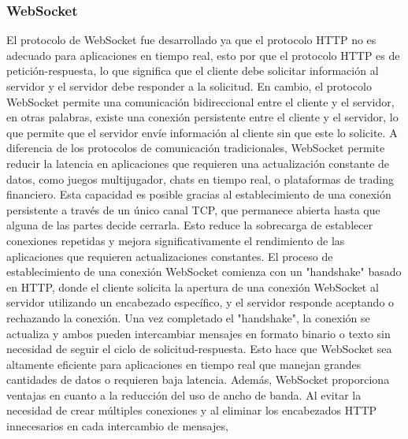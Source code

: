 \subsubsection{WebSocket}
\label{sub:WebSocket}
    El protocolo de WebSocket fue desarrollado ya que el protocolo HTTP no es adecuado para aplicaciones en tiempo real, esto por que 
        el protocolo HTTP es de petici\'on-respuesta, lo que significa que el cliente debe solicitar informaci\'on al servidor y el servidor
        debe responder a la solicitud. En cambio, el protocolo WebSocket permite una comunicaci\'on bidireccional entre el cliente y el servidor,
        en otras palabras, existe una conexi\'on persistente entre el cliente y el servidor, lo que permite que el servidor env\'ie informaci\'on
        al cliente sin que este lo solicite. \cite{Kitamura2012}
    \vskip 0.5cm
        A diferencia de los protocolos de comunicaci\'on tradicionales, WebSocket permite reducir la latencia en aplicaciones que 
            requieren una actualizaci\'on constante de datos, como juegos multijugador, chats en tiempo real, o plataformas de 
            trading financiero. Esta capacidad es posible gracias al establecimiento de una conexi\'on persistente a trav\'es de 
            un \'unico canal TCP, que permanece abierta hasta que alguna de las partes decide cerrarla. Esto reduce la sobrecarga 
            de establecer conexiones repetidas y mejora significativamente el rendimiento de las aplicaciones que requieren 
            actualizaciones constantes. \cite{RFC6455}
    \vskip 0.5cm
        El proceso de establecimiento de una conexi\'on WebSocket comienza con un "handshake" basado en HTTP, donde el cliente 
            solicita la apertura de una conexi\'on WebSocket al servidor utilizando un encabezado espec\'ifico, y el servidor 
            responde aceptando o rechazando la conexi\'on. Una vez completado el "handshake", la conexi\'on se actualiza y ambos 
            pueden intercambiar mensajes en formato binario o texto sin necesidad de seguir el ciclo de solicitud-respuesta. 
            Esto hace que WebSocket sea altamente eficiente para aplicaciones en tiempo real que manejan grandes cantidades de 
            datos o requieren baja latencia. \cite{FetteMelnikov}
    \vskip 0.5cm
        Adem\'as, WebSocket proporciona ventajas en cuanto a la reducci\'on del uso de ancho de banda. Al evitar la necesidad de 
            crear m\'ultiples conexiones y al eliminar los encabezados HTTP innecesarios en cada intercambio de mensajes, 

